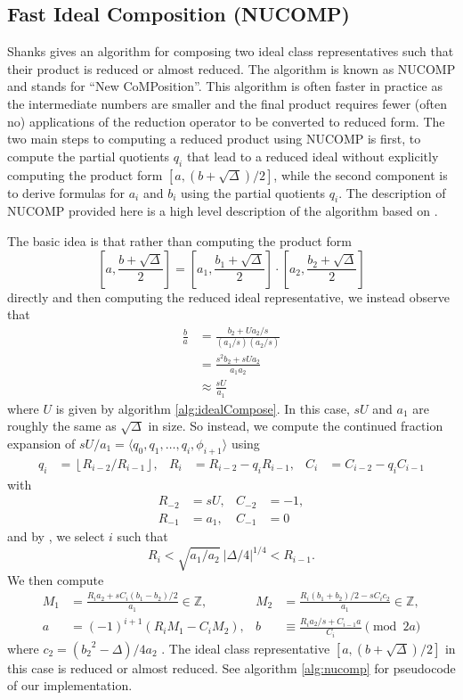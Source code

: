 \documentclass{ucalgthes1}
\theoremstyle{plain}
\theoremstyle{definition}
\newcommand{\ZZ}{\mathbb{Z}}
\newcommand{\floor}[1]{\left\lfloor #1 \right\rfloor}
\begin{document}
\subsection{Fast Ideal Composition (NUCOMP)}\label{subsec:nucomp}

Shanks gives an algorithm for composing two ideal class representatives such that their product is reduced or almost reduced.  The algorithm is known as NUCOMP and stands for ``New CoMPosition''.  This algorithm is often faster in practice as the intermediate numbers are smaller and the final product requires fewer (often no) applications of the reduction operator to be converted to reduced form.  The two main steps to computing a reduced product using NUCOMP is first, to compute the partial quotients $q_i$ that lead to a reduced ideal without explicitly computing the product form $[a,(b+\sqrt\Delta)/2]$, while the second component is to derive formulas for $a_i$ and $b_i$ using the partial quotients $q_i$.  The description of NUCOMP provided here is a high level description of the algorithm based on \cite[pp.119-123]{Jac09}.

The basic idea is that rather than computing the product form
\[
	\left[a, \frac{b+\sqrt\Delta}{2} \right] = \left[a_1, \frac{b_1+\sqrt\Delta}{2} \right] \cdot \left[a_2, \frac{b_2+\sqrt\Delta}{2} \right]
\]
directly and then computing the reduced ideal representative, we instead observe that
\begin{align*}
	\frac{b}{a} &= \frac{b_2 + Ua_2/s}{(a_1/s)(a_2/s)} \\
	&= \frac{s^2 b_2+sUa_2}{a_1a_2} \\
	&\approx \frac{sU}{a_1}
\end{align*}
where $U$ is given by algorithm \ref{alg:idealCompose}.  In this case, $sU$ and $a_1$ are roughly the same as $\sqrt\Delta$ in size.  So instead, we compute the continued fraction expansion of $sU/a_1 = \langle q_0, q_1, \dots, q_i, \phi_{i+1} \rangle$ using
\begin{align*}
	q_i &= \floor{R_{i-2} / R_{i-1}}, &
	R_i &= R_{i-2} - q_i R_{i-1}, &
	C_i &= C_{i-2} - q_i C_{i-1}
\end{align*}
with
\begin{align*}
	R_{-2} &= sU,  & C_{-2} &= -1, \\
	R_{-1} &= a_1, & C_{-1} &= 0
\end{align*}
and by \cite[Theorem 5.43]{Jac09}, we select $i$ such that
\[
	R_i < \sqrt{a_1/a_2} ~ |\Delta/4|^{1/4} < R_{i-1}.
\]
We then compute
\begin{align*}
	M_1 &= \frac{R_i a_2 + sC_i(b_1-b_2)/2}{a_1}  \in \ZZ, &
	M_2 &= \frac{R_i (b_1+b_2)/2 - s C_i c_2}{a_1} \in \ZZ, \\
	a &= (-1)^{i+1} (R_i M_1  - C_i M_2), &
	b &\equiv \frac{R_i a_2 /s + C_{i-1} a}{C_i} \pmod{2a}
\end{align*}
where $c_2 = ({b_2}^2-\Delta)/4a_2$ \cite[Equation 5.44]{Jac09}.  The ideal class representative $[a, (b+\sqrt\Delta)/2]$ in this case is reduced or almost reduced.  See algorithm \ref{alg:nucomp} for pseudocode of our implementation.
\end{document}
